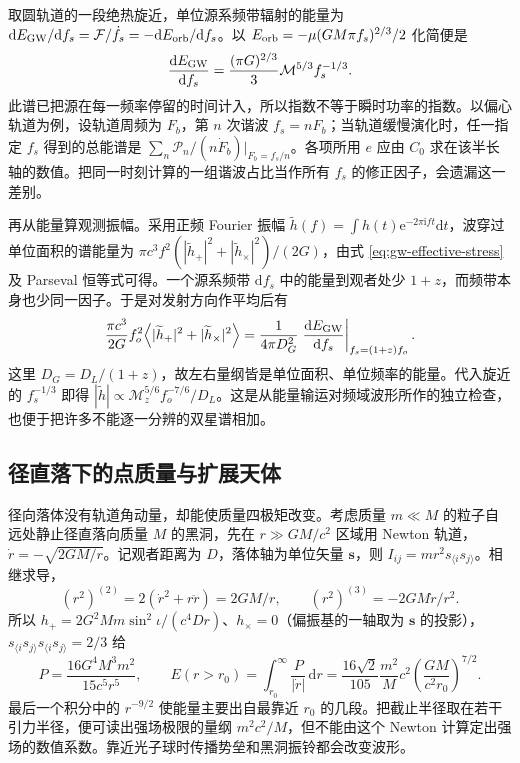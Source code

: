 取圆轨道的一段绝热旋近，单位源系频带辐射的能量为 $\mathrm d E_{\rm GW}/\mathrm df_s=\mathcal F/\dot f_s=-\mathrm dE_{\rm orb}/\mathrm df_s$。以 $E_{\rm orb}=-\mu(GM\pi f_s)^{2/3}/2$ 化简便是
\[
 \frac{\mathrm dE_{\rm GW}}{\mathrm df_s}
    =\frac{(\pi G)^{2/3}}{3}\mathcal M^{5/3} f_s^{-1/3}.
\]
此谱已把源在每一频率停留的时间计入，所以指数不等于瞬时功率的指数。以偏心轨道为例，设轨道周频为 $F_b$，第 $n$ 次谐波 $f_s=nF_b$；当轨道缓慢演化时，任一指定 $f_s$ 得到的总能谱是 $\sum_n \mathcal P_n/(n\dot F_b)|_{F_b=f_s/n}$。各项所用 $e$ 应由 $C_0$ 求在该半长轴的数值。把同一时刻计算的一组谐波占比当作所有 $f_s$ 的修正因子，会遗漏这一差别。

再从能量算观测振幅。采用正频 Fourier 振幅 $\widetilde h(f)=\int h(t)\mathrm e^{-2\pi\mathrm i ft}\mathrm dt$，波穿过单位面积的谱能量为 $\pi c^3 f^2(|\widetilde h_+|^2+|\widetilde h_\times|^2)/(2G)$，由式 \eqref{eq:gw-effective-stress} 及 Parseval 恒等式可得。一个源系频带 $\mathrm df_s$ 中的能量到观者处少 $1+z$，而频带本身也少同一因子。于是对发射方向作平均后有
\[
 \frac{\pi c^3}{2G} f_o^2\!\left\langle|\widetilde h_+|^2+|\widetilde h_\times|^2\right\rangle
     =\frac{1}{4\pi D_G^2}
       \left.\frac{\mathrm dE_{\rm GW}}{\mathrm df_s}\right|_{f_s=(1+z)f_o}.
\]
这里 $D_G=D_L/(1+z)$，故左右量纲皆是单位面积、单位频率的能量。代入旋近的 $f_s^{-1/3}$ 即得 $|\widetilde h|\propto \mathcal M_z^{5/6}f_o^{-7/6}/D_L$。这是从能量输运对频域波形所作的独立检查，也便于把许多不能逐一分辨的双星谱相加。

\subsection{径直落下的点质量与扩展天体}

径向落体没有轨道角动量，却能使质量四极矩改变。考虑质量 $m\ll M$ 的粒子自远处静止径直落向质量 $M$ 的黑洞，先在 $r\gg GM/c^2$ 区域用 Newton 轨道，$\dot r=-\sqrt{2GM/r}$。记观者距离为 $D$，落体轴为单位矢量 $\bm s$，则 $I_{ij}=m r^2s_{\langle i}s_{j\rangle}$。相继求导，
\[
 (r^2)^{(2)}=2(\dot r^2+r\ddot r)=2GM/r,\qquad
 (r^2)^{(3)}=-2GM\dot r/r^2 .
\]
所以 $h_+=2G^2Mm\sin^2\iota/(c^4Dr)$、$h_\times=0$（偏振基的一轴取为 $\bm s$ 的投影），$s_{\langle i}s_{j\rangle}s_{\langle i}s_{j\rangle}=2/3$ 给
\[
 P=\frac{16G^4M^3m^2}{15c^5r^5},\qquad
 E(r>r_0)=\int_{r_0}^{\infty}\frac{P}{|\dot r|}\,\mathrm dr
      =\frac{16\sqrt2}{105}\frac{m^2}{M}c^2
         \left(\frac{GM}{c^2r_0}\right)^{7/2}.
\]
最后一个积分中的 $r^{-9/2}$ 使能量主要出自最靠近 $r_0$ 的几段。把截止半径取在若干引力半径，便可读出强场极限的量纲 $m^2c^2/M$，但不能由这个 Newton 计算定出强场的数值系数。靠近光子球时传播势垒和黑洞振铃都会改变波形。

